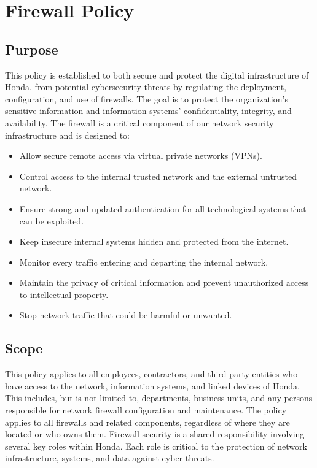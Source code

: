 \chapter{Firewall Policy}
\pagestyle{fancy}

\fancyhf{}

\fancyfoot[C]{\thepage}

\renewcommand{\headrulewidth}{0pt}
\renewcommand{\footrulewidth}{0pt}

\section{Purpose}
This policy is established to both secure and protect the digital infrastructure of Honda. from potential cybersecurity threats by regulating the deployment, configuration, and use of firewalls. The goal is to protect the organization's sensitive information and information systems' confidentiality, integrity, and availability. The firewall is a critical component of our network security infrastructure and is designed to:
\begin{itemize}
    \item Allow secure remote access via virtual private networks (VPNs).
    \item Control access to the internal trusted network and the external untrusted network.
    \item Ensure strong and updated authentication for all technological systems that can be exploited.
    \item Keep insecure internal systems hidden and protected from the internet.
    \item Monitor every traffic entering and departing the internal network.
    \item Maintain the privacy of critical information and prevent unauthorized access to intellectual property.
    \item Stop network traffic that could be harmful or unwanted.
\end{itemize}

\section{Scope}
This policy applies to all employees, contractors, and third-party entities who have access to the network, information systems, and linked devices of Honda. This includes, but is not limited to, departments, business units, and any persons responsible for network firewall configuration and maintenance. The policy applies to all firewalls and related components, regardless of where they are located or who owns them. Firewall security is a shared responsibility involving several key roles within Honda. Each role is critical to the protection of network infrastructure, systems, and data against cyber threats.


